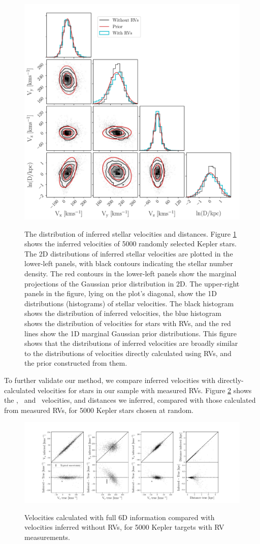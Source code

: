 \begin{figure}[ht!]
\caption{
The distribution of inferred stellar velocities and distances.
    Figure \ref{fig:results} shows the inferred velocities of 5000 randomly
selected Kepler stars.
The 2D distributions of inferred stellar velocities are plotted in the
lower-left panels, with black contours indicating the stellar number density.
The red contours in the lower-left panels show the marginal projections of
    the Gaussian prior distribution in 2D.
The upper-right panels in the figure, lying on the plot's diagonal, show the
    1D distributions (histograms) of stellar velocities.
The black histogram shows the distribution of inferred velocities, the blue
histogram shows the distribution of velocities for stars with RVs,
and the red lines show the 1D marginal Gaussian prior distributions.
This figure shows that the distributions of inferred velocities are
    broadly similar to the distributions of velocities directly calculated
    using RVs, and the prior constructed from them.
}
  \centering
    \includegraphics[width=.7\textwidth]{results}
\label{fig:results}
\end{figure}
To further validate our method, we compare inferred velocities with
directly-calculated velocities for stars in our sample with measured RVs.
Figure \ref{fig:residuals} shows the \vx, \vy\ and \vz\ velocities, and
distances we inferred, compared with those calculated from measured RVs, for
5000 Kepler stars chosen at random.
\begin{figure}[ht!]
\caption{Velocities calculated with full 6D information compared with
    velocities inferred without RVs, for 5000 Kepler targets with RV
    measurements.}
  \centering
    \includegraphics[width=1\textwidth]{residuals}
\label{fig:residuals}
\end{figure}
